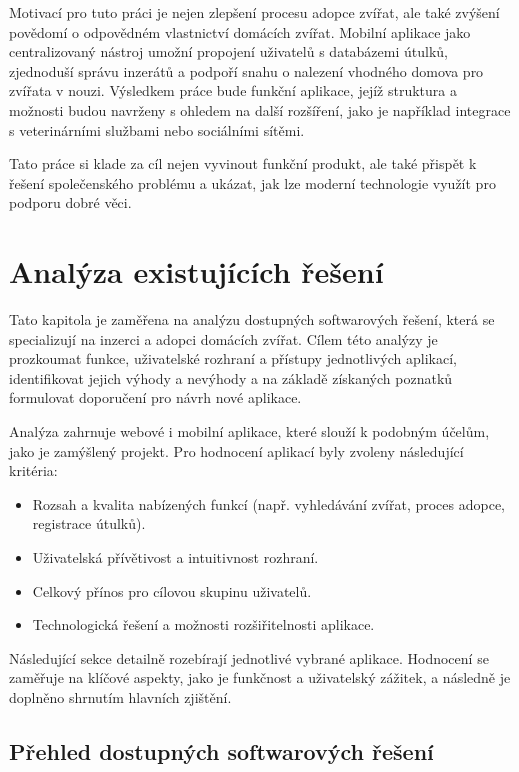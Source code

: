 \documentclass[12pt,a4paper]{report}
\begin{document}
Motivací pro tuto práci je nejen zlepšení procesu adopce zvířat, ale také zvýšení povědomí o odpovědném vlastnictví domácích zvířat. Mobilní aplikace jako centralizovaný nástroj umožní propojení uživatelů s databázemi útulků, zjednoduší správu inzerátů a podpoří snahu o nalezení vhodného domova pro zvířata v nouzi. Výsledkem práce bude funkční aplikace, jejíž struktura a možnosti budou navrženy s ohledem na další rozšíření, jako je například integrace s veterinárními službami nebo sociálními sítěmi.

Tato práce si klade za cíl nejen vyvinout funkční produkt, ale také přispět k řešení společenského problému a ukázat, jak lze moderní technologie využít pro podporu dobré věci.


\chapter{Analýza existujících řešení}

Tato kapitola je zaměřena na analýzu dostupných softwarových řešení, která se specializují na inzerci a adopci domácích zvířat. Cílem této analýzy je prozkoumat funkce, uživatelské rozhraní a přístupy jednotlivých aplikací, identifikovat jejich výhody a nevýhody a na základě získaných poznatků formulovat doporučení pro návrh nové aplikace.

Analýza zahrnuje webové i mobilní aplikace, které slouží k podobným účelům, jako je zamýšlený projekt. Pro hodnocení aplikací byly zvoleny následující kritéria:
\begin{itemize}
    \item Rozsah a kvalita nabízených funkcí (např. vyhledávání zvířat, proces adopce, registrace útulků).
    \item Uživatelská přívětivost a intuitivnost rozhraní.
    \item Celkový přínos pro cílovou skupinu uživatelů.
    \item Technologická řešení a možnosti rozšiřitelnosti aplikace.
\end{itemize}

Následující sekce detailně rozebírají jednotlivé vybrané aplikace. Hodnocení se zaměřuje na klíčové aspekty, jako je funkčnost a uživatelský zážitek, a následně je doplněno shrnutím hlavních zjištění.

\section{Přehled dostupných softwarových řešení}
\end{document}

